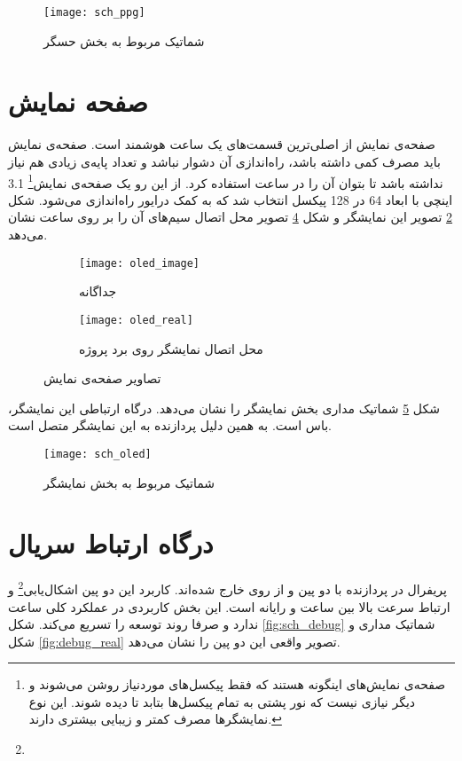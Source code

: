 \begin{figure}[h]
	\centering
	\texttt{[image: sch\_ppg]}
	\caption{شماتیک مربوط به بخش حسگر }
	\label{fig:sch-ppg}
\end{figure}


\section{صفحه نمایش}
صفحه‌ی نمایش از اصلی‌ترین قسمت‌های یک ساعت هوشمند است. صفحه‌ی نمایش باید مصرف کمی داشته باشد، راه‌اندازی آن دشوار نباشد و تعداد پایه‌ی زیادی هم نیاز نداشته باشد تا بتوان آن را در ساعت استفاده کرد. از این رو یک صفحه‌ی نمایش\footnote{صفحه‌ی نمایش‌های  اینگونه هستند که فقط پیکسل‌های موردنیاز روشن می‌شوند و دیگر نیازی نیست که نور پشتی به تمام پیکسل‌ها بتابد تا دیده شوند. این نوع نمایشگرها مصرف کمتر و زیبایی بیشتری دارند.} 3.1 اینچی با ابعاد 64 در 128 پیکسل انتخاب شد که به کمک درایور  راه‌اندازی می‌شود. شکل \ref{fig:oled_image} تصویر این نمایشگر و شکل \ref{fig:oled_real} تصویر محل اتصال سیم‌های آن را بر روی \pcbf ساعت نشان می‌دهد.

\begin{figure}[h]
	\centering
	\begin{subfigure}{0.44\textwidth}
		\centering
		\texttt{[image: oled\_image]}
		\caption{جداگانه}
		\label{fig:oled_image}
	\end{subfigure}
	\begin{subfigure}{0.44\textwidth}
		\centering
		\texttt{[image: oled\_real]}
		\caption{محل اتصال نمایشگر روی برد پروژه}
		\label{fig:oled_real}
	\end{subfigure}
	\caption{تصاویر صفحه‌ی نمایش}
\end{figure}

شکل \ref{fig:sch-oled} شماتیک مداری بخش نمایشگر را نشان می‌دهد. درگاه ارتباطی این نمایشگر، باس  است. به همین دلیل  پردازنده به این نمایشگر متصل است.

\begin{figure}[h]
	\centering
	\texttt{[image: sch\_oled]}
	\caption{شماتیک مربوط به بخش نمایشگر}
	\label{fig:sch-oled}
\end{figure}

\section{درگاه ارتباط سریال}

پریفرال  در پردازنده با دو پین  و  از روی \pcbf خارج شده‌اند. کاربرد این دو پین اشکال‌یابی\footnote{} و ارتباط سرعت بالا بین ساعت و رایانه است. این بخش کاربردی در عملکرد کلی ساعت ندارد و صرفا روند توسعه را تسریع می‌کند. شکل \ref{fig:sch_debug} شماتیک مداری و شکل \ref{fig:debug_real} تصویر واقعی این دو پین را نشان می‌دهد.

